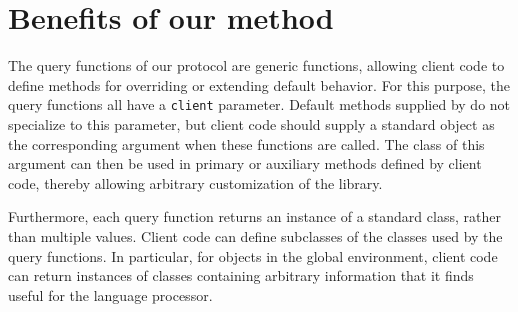 \section{Benefits of our method}
 
The query functions of our protocol are generic functions, allowing
client code to define methods for overriding or extending default
behavior.  For this purpose, the query functions all have a
\texttt{client} parameter.  Default methods supplied by \trucler{} do
not specialize to this parameter, but client code should supply a
standard object as the corresponding argument when these functions are
called.  The class of this argument can then be used in primary or
auxiliary methods defined by client code, thereby allowing arbitrary
customization of the library.

Furthermore, each query function returns an instance of a standard
class, rather than multiple values.  Client code can define subclasses
of the classes used by the query functions.  In particular, for
objects in the global environment, client code can return instances of
classes containing arbitrary information that it finds useful for the
language processor.
